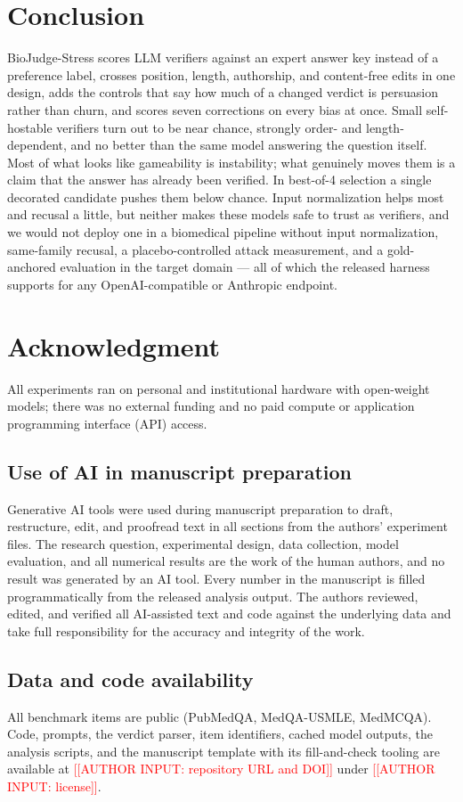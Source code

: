 \documentclass[conference]{IEEEtran}
\newcommand{\ain}[1]{\textcolor{red}{[[AUTHOR INPUT: #1]]}}
\begin{document}
\section{Conclusion}
BioJudge-Stress scores LLM verifiers against an expert answer key instead of a preference label, crosses position, length, authorship, and content-free edits in one design, adds the controls that say how much of a changed verdict is persuasion rather than churn, and scores seven corrections on every bias at once. Small self-hostable verifiers turn out to be near chance, strongly order- and length-dependent, and no better than the same model answering the question itself. Most of what looks like gameability is instability; what genuinely moves them is a claim that the answer has already been verified. In best-of-4 selection a single decorated candidate pushes them below chance. Input normalization helps most and recusal a little, but neither makes these models safe to trust as verifiers, and we would not deploy one in a biomedical pipeline without input normalization, same-family recusal, a placebo-controlled attack measurement, and a gold-anchored evaluation in the target domain --- all of which the released harness supports for any OpenAI-compatible or Anthropic endpoint.

\section*{Acknowledgment}
All experiments ran on personal and institutional hardware with open-weight models; there was no external funding and no paid compute or application programming interface (API) access.

\subsection*{Use of AI in manuscript preparation}
Generative AI tools were used during manuscript preparation to draft, restructure, edit, and proofread text in all sections from the authors' experiment files. The research question, experimental design, data collection, model evaluation, and all numerical results are the work of the human authors, and no result was generated by an AI tool. Every number in the manuscript is filled programmatically from the released analysis output. The authors reviewed, edited, and verified all AI-assisted text and code against the underlying data and take full responsibility for the accuracy and integrity of the work.

\subsection*{Data and code availability}
All benchmark items are public (PubMedQA, MedQA-USMLE, MedMCQA). Code, prompts, the verdict parser, item identifiers, cached model outputs, the analysis scripts, and the manuscript template with its fill-and-check tooling are available at \ain{repository URL and DOI} under \ain{license}.
\end{document}
